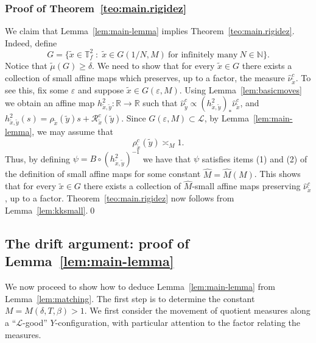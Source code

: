 \documentclass[a4paper,11pt,reqno]{amsart}
\newcommand{\R}{{\mathbb R}}
\newcommand{\N}{{\mathbb N}}
\newcommand{\TTf}{{\mathbb{T}_f^2}}
\newcommand{\cL}{{\mathcal L}}
\newcommand{\cR}{{\mathcal R}}
\newcommand{\eps}{\varepsilon}
\newcommand{\tix}{\tilde{x}}
\newcommand{\tm}{\tilde{\mu}}
\theoremstyle{definition}
\begin{document}
\subsubsection{Proof of Theorem~\ref{teo:main.rigidez}}
We claim that Lemma~\ref{lem:main-lemma} implies Theorem~\ref{teo:main.rigidez}. Indeed, define 
\[
G=\{\tix\in\TTf \; : \;\tix\in G(1/N,M)\:\textrm{for infinitely many}\:N\in\N\}.
\]
Notice that $\tm(G)\geq\delta$. We need to show that for every $\tix\in G$ there exists a collection of small affine maps which preserves, up to a factor, the measure $\hat{\nu}^c_{\tix}$. To see this, fix some $\eps$ and suppose $\tix\in G(\eps,M)$. Using Lemma~\ref{lem:basicmoves} we obtain an affine map $h^2_{\tix,\tilde{y}}:\R\to\R$ such that $\hat{\nu}^c_{\tilde{y}}\propto (h^2_{\tix,\tilde{y}})_*\hat{\nu}^c_{\tix}$, and $h^2_{\tix,\tilde{y}}(s)=\rho_{\tix}(\tilde{y})s+\cR^c_{\tix}(\tilde{y})$. Since $G(\eps,M)\subset\cL$, by Lemma~\ref{lem:main-lemma}, we may assume that 
\[
\rho^c_{\tix}(\tilde{y})\asymp_M 1.
\]
Thus, by defining $\psi=B\circ(h^2_{\tix,\tilde{y}})^{-1}$ we have that $\psi$ satisfies items (1) and (2) of the definition of small affine maps for some constant $\hat{M}=\hat{M}(M)$. This shows that for every $\tix\in G$ there exists a collection of $\hat{M}$-small affine maps preserving $\hat{\nu}^c_{\tix}$, up to a factor. Theorem~\ref{teo:main.rigidez} now follows from Lemma~\ref{lem:kksmall}.\qed
\subsection{The drift argument: proof of Lemma~\ref{lem:main-lemma}}
We now proceed to show how to deduce Lemma~\ref{lem:main-lemma} from Lemma~\ref{lem:matching}. The first step is to determine the constant $M=M(\delta,T,\beta)>1$. We first consider the movement of quotient measures along a ``$\cL$-good'' $Y$-configuration, with particular attention to the factor relating the measures. 
\end{document}
